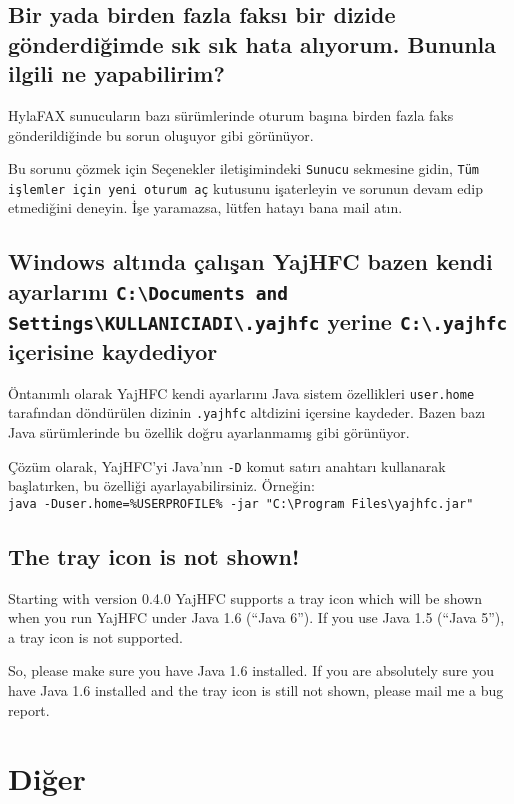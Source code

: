 \documentclass[a4paper,10pt]{scrartcl}
\begin{document}
\subsection{Bir yada birden fazla faksı bir dizide gönderdiğimde sık sık hata alıyorum. Bununla ilgili ne yapabilirim?}

HylaFAX sunucuların bazı sürümlerinde oturum başına birden fazla faks gönderildiğinde bu sorun oluşuyor gibi görünüyor.

Bu sorunu çözmek için Seçenekler iletişimindeki \texttt{Sunucu} sekmesine gidin, \texttt{Tüm işlemler için yeni oturum aç} kutusunu işaterleyin ve sorunun devam edip etmediğini deneyin.
İşe yaramazsa, lütfen hatayı bana mail atın.

\subsection{Windows altında çalışan YajHFC bazen kendi ayarlarını \texttt{C:\textbackslash Documents and Settings\textbackslash KULLANICIADI\textbackslash .yajhfc} yerine \texttt{C:\textbackslash .yajhfc} içerisine kaydediyor}

Öntanımlı olarak YajHFC kendi ayarlarını Java sistem özellikleri \texttt{user.home} tarafından döndürülen dizinin 
\texttt{.yajhfc} altdizini içersine kaydeder.
Bazen bazı Java sürümlerinde bu özellik doğru ayarlanmamış gibi görünüyor.

Çözüm olarak, YajHFC'yi Java'nın \texttt{-D} komut satırı anahtarı kullanarak başlatırken, bu özelliği ayarlayabilirsiniz. Örneğin: \\
\texttt{java -Duser.home=\%USERPROFILE\% -jar "C:\textbackslash Program Files\textbackslash yajhfc.jar"}

\subsection{The tray icon is not shown!}

Starting with version 0.4.0 YajHFC supports a tray icon which will be shown when you run YajHFC under Java 1.6 (``Java 6'').
If you use Java 1.5 (``Java 5''), a tray icon is not supported.

So, please make sure you have Java 1.6 installed. If you are absolutely sure you have Java 1.6 installed and the tray icon is still not shown, please mail me a bug report.

\section{Diğer}
\end{document}

